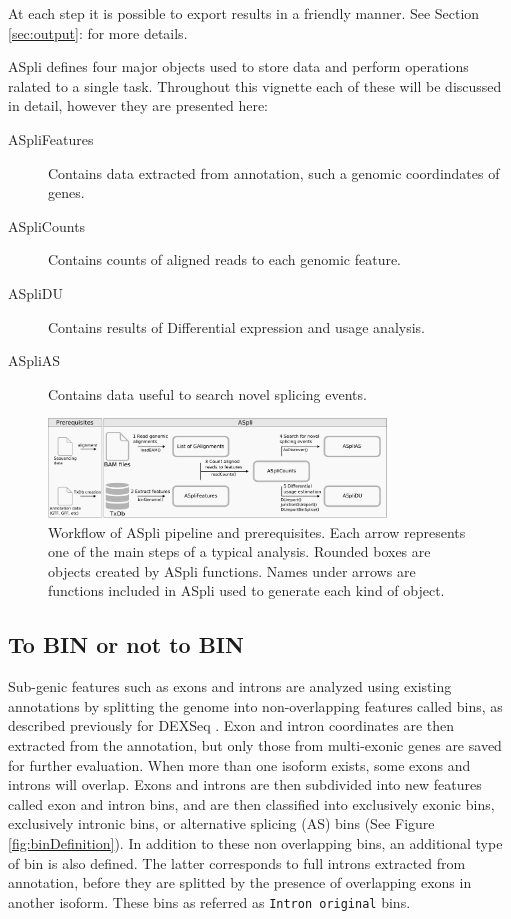 \documentclass{article}
\begin{document}
At each step it is possible to export results in a friendly manner. 
See Section \ref{sec:output}: for more details.

ASpli defines four major objects used to store data and perform operations
ralated to a single task. Throughout this vignette each of these will be
discussed in detail, however they are presented here:
\begin{description}
  \item[ASpliFeatures] Contains data extracted from annotation, such a genomic
  coordindates of genes.
  \item[ASpliCounts] Contains counts of aligned reads to each genomic feature.
  \item[ASpliDU] Contains results of Differential expression and usage analysis.
  \item[ASpliAS] Contains data useful to search novel splicing events.
\end{description}

\begin{figure}[ht!]
\centering
\includegraphics[width=0.8\textwidth]{images/workflow.pdf}
\caption{ Workflow of ASpli pipeline and prerequisites.  Each arrow represents
one of the main steps of a typical analysis. Rounded boxes are objects created
by ASpli functions.  Names under arrows are functions included in ASpli used to
generate each kind of object. }
\label{fig:ASpliStructure}
\end{figure}

\subsection{ To BIN or not to BIN }
\label{sec:binDefinition}
Sub-genic features such as exons and introns are analyzed using existing
annotations by splitting the genome into non-overlapping features called bins, 
as described previously for DEXSeq \cite{pmid22722343}. Exon and intron 
coordinates are then extracted from the annotation, but only those from 
multi-exonic genes are saved for further evaluation. When more than one isoform 
exists, some exons and introns will overlap. Exons and introns are then 
subdivided into new features called exon and intron bins, and are then 
classified into exclusively exonic bins, exclusively intronic bins, or 
alternative splicing (AS) bins (See Figure \ref{fig:binDefinition}). 
In addition to these non overlapping bins, an additional type of bin is also
defined. The latter corresponds to full introns extracted from annotation,
before they are splitted by the presence of overlapping exons in another
isoform. These bins as referred as \texttt{Intron original} bins.
\end{document}
